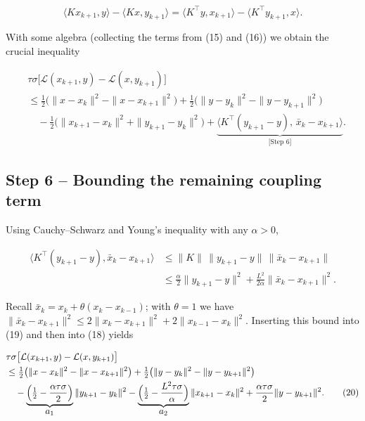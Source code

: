\documentclass{article}
\begin{document}
\[
\langle Kx_{k+1},y\rangle-\langle Kx,y_{k+1}\rangle
= \langle K^{\!\top}y, x_{k+1}\rangle-\langle K^{\!\top}y_{k+1},x\rangle. \tag{17}
\]

With some algebra (collecting the terms from (15) and (16)) we obtain the crucial inequality  

\[
\begin{aligned}
&\tau\sigma\bigl[\mathcal L(x_{k+1},y)-\mathcal L(x,y_{k+1})\bigr] \\
&\le \tfrac12\bigl(\|x-x_{k}\|^{2}-\|x-x_{k+1}\|^{2}\bigr)
      +\tfrac12\bigl(\|y-y_{k}\|^{2}-\|y-y_{k+1}\|^{2}\bigr) \\
&\quad -\tfrac12\bigl(\|x_{k+1}-x_{k}\|^{2}+\|y_{k+1}-y_{k}\|^{2}\bigr)
      +\underbrace{\langle K^{\!\top}(y_{k+1}-y),\,\bar x_{k}-x_{k+1}\rangle}_{\displaystyle \text{[Step 6]}}. \tag{18}
\end{aligned}
\]

\subsection*{Step 6 – Bounding the remaining coupling term}
Using Cauchy–Schwarz and Young’s inequality with any $\alpha>0$,

\[
\begin{aligned}
\langle K^{\!\top}(y_{k+1}-y),\bar x_{k}-x_{k+1}\rangle
&\le \|K\|\,\|y_{k+1}-y\|\,\|\bar x_{k}-x_{k+1}\| \\
&\le \frac{\alpha}{2}\|y_{k+1}-y\|^{2}
   +\frac{L^{2}}{2\alpha}\|\bar x_{k}-x_{k+1}\|^{2}. \tag{19}
\end{aligned}
\]

Recall $\bar x_{k}=x_{k}+\theta(x_{k}-x_{k-1})$; with $\theta=1$ we have  
$\|\bar x_{k}-x_{k+1}\|^{2}\le 2\|x_{k}-x_{k+1}\|^{2}+2\|x_{k-1}-x_{k}\|^{2}$.
Inserting this bound into (19) and then into (18) yields

\[
\begin{aligned}
&\tau\sigma\bigl[\mathcal L(x_{k+1},y)-\mathcal L(x,y_{k+1})\bigr] \\
&\le \tfrac12\bigl(\|x-x_{k}\|^{2}-\|x-x_{k+1}\|^{2}\bigr)
   +\tfrac12\bigl(\|y-y_{k}\|^{2}-\|y-y_{k+1}\|^{2}\bigr) \\
&\quad -\underbrace{\Bigl(\tfrac12-\frac{\alpha\tau\sigma}{2}\Bigr)}_{\displaystyle a_{1}}
      \|y_{k+1}-y_{k}\|^{2}
   -\underbrace{\Bigl(\tfrac12-\frac{L^{2}\tau\sigma}{\alpha}\Bigr)}_{\displaystyle a_{2}}
      \|x_{k+1}-x_{k}\|^{2}
   +\frac{\alpha\tau\sigma}{2}\|y-y_{k+1}\|^{2}. \tag{20}
\end{aligned}
\]
\end{document}
